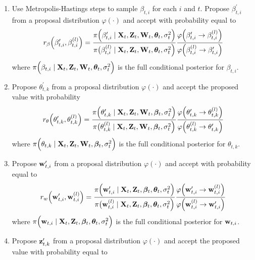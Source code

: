 \documentclass[a4paper, 11pt]{report}
\begin{document}
\begin{itemize}
\begin{enumerate}
    \item Use Metropolis-Hastings steps to sample $\beta_{t,i}$ for each $i$ and $t$. Propose $\beta^\prime_{t,i}$ from a proposal distribution $\varphi(\cdot)$ and accept with probability equal to
\begin{equation*}
    r_\beta \Big( \beta^\prime_{t,i},\beta^{(l)}_{t,i} \Big) = \frac{\pi \Big( \beta^\prime_{t,i} \mid {\bf X}_t,{\bf Z}_t,{\bf W}_t,{\boldsymbol \theta}_t,\sigma^2_t \Big)}{\pi \big( \beta^{(l)}_{t,i} \mid {\bf X}_t,{\bf Z}_t,{\bf W}_t,{\boldsymbol \theta}_t,\sigma^2_t\Big)}\frac{\varphi \Big(\beta^\prime_{t,i}\rightarrow \beta^{(l)}_{t,i} \Big)}{\varphi \Big(\beta^{(l)}_{t,i}\rightarrow \beta^\prime_{t,i} \Big)}
\end{equation*}
where $\pi \Big( \beta_{t,i} \mid {\bf X}_t,{\bf Z}_t,{\bf W}_t,{\boldsymbol \theta}_t,\sigma^2_t \Big)$ is the full conditional posterior for $\beta_{t,i}$.
\item Propose $\theta^\prime_{t,k}$ from a proposal distribution $\varphi(\cdot)$ and accept the proposed value with probability
\begin{equation*}
    r_\theta \Big( \theta^\prime_{t,k},\theta^{(l)}_{t,k} \Big) = \frac{\pi \Big( \theta^\prime_{t,k} \mid {\bf X}_t,{\bf Z}_t,{\bf W}_t,{\boldsymbol \beta}_t,\sigma^2_t \Big)}{\pi \big( \theta^{(l)}_{t,k} \mid {\bf X}_t,{\bf Z}_t,{\bf W}_t,{\boldsymbol \beta}_t,\sigma^2_t\Big)}\frac{\varphi \Big(\theta^\prime_{t,k}\rightarrow \theta^{(l)}_{t,k} \Big)}{\varphi \Big(\theta^{(l)}_{t,k}\rightarrow \theta^\prime_{t,k} \Big)}
\end{equation*}
where $\pi \Big( \theta_{t,k} \mid {\bf X}_t,{\bf Z}_t,{\bf W}_t,{\boldsymbol \beta}_t,\sigma^2_t \Big)$ is the full conditional posterior for $\theta_{t,k}$.
\item Propose ${\bf w}^\prime_{t,i}$ from a proposal distribution $\varphi(\cdot)$ and accept with probability equal to
\begin{equation*}
    r_w \Big( {\bf w}^\prime_{t,i},{\bf w}^{(l)}_{t,i} \Big) = \frac{\pi \Big( {\bf w}^\prime_{t,i} \mid {\bf X}_t,{\bf Z}_t,{\boldsymbol \beta}_t,{\boldsymbol \theta}_t,\sigma^2_t \Big)}{\pi \big( {\bf w}^{(l)}_{t,i} \mid {\bf X}_t,{\bf Z}_t,{\boldsymbol \beta}_t,{\boldsymbol \theta}_t,\sigma^2_t\Big)}\frac{\varphi \Big({\bf w}^\prime_{t,i}\rightarrow {\bf w}^{(l)}_{t,i} \Big)}{\varphi \Big({\bf w}^{(l)}_{t,i}\rightarrow {\bf w}^\prime_{t,i} \Big)}
\end{equation*}
where $\pi \Big( {\bf w}_{t,i} \mid {\bf X}_t,{\bf Z}_t,{\boldsymbol \beta}_t,{\boldsymbol \theta}_t,\sigma^2_t \Big)$ is the full conditional posterior for ${\bf w}_{t,i}$.
\item Propose ${\bf z}^\prime_{t,k}$ from a proposal distribution $\varphi(\cdot)$ and accept the proposed value with probability equal to


\end{enumerate}
\end{itemize}
\end{document}
